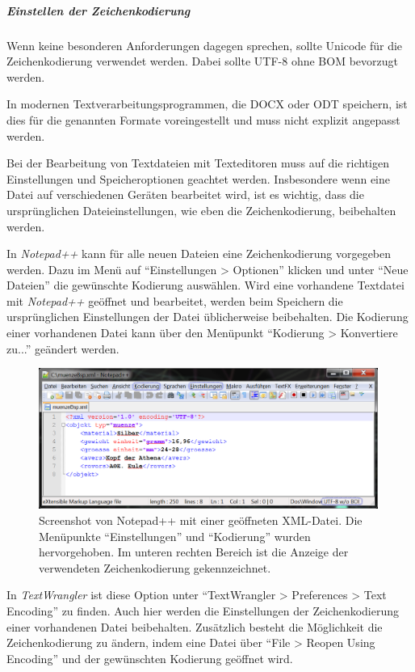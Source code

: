 \subparagraph{Einstellen der Zeichenkodierung}\label{text-encodingEinstellen}
Wenn keine besonderen Anforderungen dagegen sprechen, sollte Unicode für die Zeichenkodierung verwendet werden. Dabei sollte UTF-8 ohne BOM bevorzugt werden. 

In modernen Textverarbeitungsprogrammen, die DOCX oder ODT speichern, ist dies für die genannten Formate voreingestellt und muss nicht explizit angepasst werden.

Bei der Bearbeitung von Textdateien mit Texteditoren muss auf die richtigen Einstellungen und Speicheroptionen geachtet werden. Insbesondere wenn eine Datei auf verschiedenen Geräten bearbeitet wird, ist es wichtig, dass die ursprünglichen Dateieinstellungen, wie eben die Zeichenkodierung, beibehalten werden. 

In \emph{Notepad++} kann für alle neuen Dateien eine Zeichenkodierung vorgegeben werden. Dazu im Menü auf "`Einstellungen > Optionen"' klicken und unter "`Neue Dateien"' die gewünschte Kodierung auswählen. Wird eine vorhandene Textdatei mit \emph{Notepad++} geöffnet und bearbeitet, werden beim Speichern die ursprünglichen Einstellungen der Datei üblicherweise beibehalten. Die Kodierung einer vorhandenen Datei kann über den Menüpunkt "`Kodierung > Konvertiere zu..."' geändert werden. 

\begin{figure}[htb!]
  \begin{center}
    \includegraphics[width=0.99\textwidth]{bilder/text_notepadMarkierung}
  \end{center}
  \caption{Screenshot von Notepad++ mit einer geöffneten XML-Datei. Die Menüpunkte "`Einstellungen"' und "`Kodierung"' wurden hervorgehoben. Im unteren rechten Bereich ist die Anzeige der verwendeten Zeichenkodierung gekennzeichnet.}
  \label{abb:text-notepad}
\end{figure}


In \emph{TextWrangler} ist diese Option unter "`TextWrangler > Preferences > Text Encoding"' zu finden. Auch hier werden die Einstellungen der Zeichenkodierung einer vorhandenen Datei beibehalten. Zusätzlich besteht die Möglichkeit die Zeichenkodierung zu ändern, indem eine Datei über "`File > Reopen Using Encoding"' und der gewünschten Kodierung geöffnet wird. 

